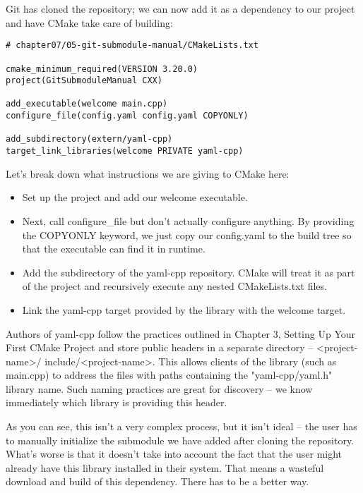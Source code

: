 Git has cloned the repository; we can now add it as a dependency to our project and have CMake take care of building:

\begin{lstlisting}[style=styleCMake]
# chapter07/05-git-submodule-manual/CMakeLists.txt

cmake_minimum_required(VERSION 3.20.0)
project(GitSubmoduleManual CXX)

add_executable(welcome main.cpp)
configure_file(config.yaml config.yaml COPYONLY)

add_subdirectory(extern/yaml-cpp)
target_link_libraries(welcome PRIVATE yaml-cpp)
\end{lstlisting}

Let's break down what instructions we are giving to CMake here:

\begin{itemize}
\item 
Set up the project and add our welcome executable.

\item 
Next, call configure\_file but don't actually configure anything. By providing the COPYONLY keyword, we just copy our config.yaml to the build tree so that the executable can find it in runtime.

\item 
Add the subdirectory of the yaml-cpp repository. CMake will treat it as part of the project and recursively execute any nested CMakeLists.txt files.

\item 
Link the yaml-cpp target provided by the library with the welcome target.
\end{itemize}

Authors of yaml-cpp follow the practices outlined in Chapter 3, Setting Up Your First CMake Project and store public headers in a separate directory – <project-name>/ include/<project-name>. This allows clients of the library (such as main.cpp) to address the files with paths containing the "yaml-cpp/yaml.h" library name. Such naming practices are great for discovery – we know immediately which library is providing this header.

As you can see, this isn't a very complex process, but it isn't ideal – the user has to manually initialize the submodule we have added after cloning the repository. What's worse is that it doesn't take into account the fact that the user might already have this library installed in their system. That means a wasteful download and build of this dependency. There has to be a better way.

